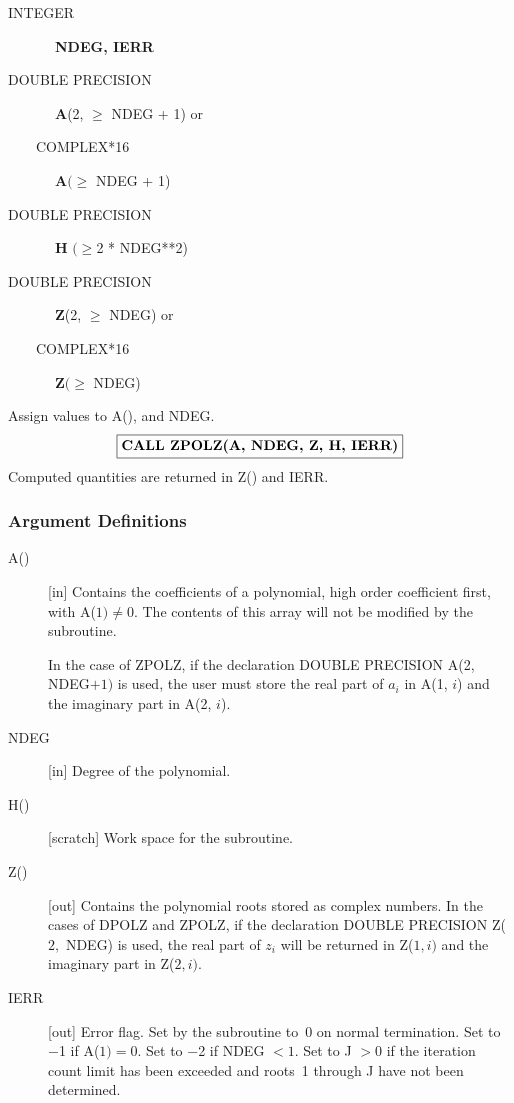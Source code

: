 \documentclass[twoside]{MATH77}
\begin{document}
\begin{description}
\item[INTEGER]  \ {\bf NDEG, IERR}

\item[DOUBLE PRECISION]  \ {\bf A}(2, $\geq $ NDEG + 1) or

\item[~~~~COMPLEX*16]  \ {\bf A}$(\geq $ NDEG + 1)

\item[DOUBLE PRECISION]  \ {\bf H} $(\geq $2 * NDEG**2)

\item[DOUBLE PRECISION]  \ {\bf Z}(2, $\geq $ NDEG) or

\item[~~~~COMPLEX*16]  \ {\bf Z}$(\geq $ NDEG)
\end{description}

Assign values to A(), and NDEG.%
$$
\fbox{{\bf CALL ZPOLZ(A, NDEG, Z, H, IERR)}}
$$
Computed quantities are returned in Z() and IERR.

\subsubsection{Argument Definitions}

\begin{description}
\item[A()]  [in] Contains the coefficients of a polynomial, high order
coefficient first, with A($1)\neq 0$. The contents of this array will not be
modified by the subroutine.

In the case of ZPOLZ, if the declaration DOUBLE PRECISION A(2, NDEG$+1)$ is
used, the user must store the real part of $a_i$ in A(1, $i$) and the imaginary
part in A(2, $i$).

\item[NDEG]  [in] Degree of the polynomial.

\item[H()]  [scratch] Work space for the subroutine.

\item[Z()]  [out] Contains the polynomial roots stored as complex numbers.
In the cases of DPOLZ and ZPOLZ, if the declaration DOUBLE PRECISION Z($2,$
NDEG) is used, the real part of $z_i$ will be returned in Z($1, i)$ and the
imaginary part in Z($2, i).$

\item[IERR]  [out] Error flag. Set by the subroutine to~0 on normal
termination. Set to $-$1 if A($1)=0$. Set to $-$2 if NDEG $<1$. Set to J $>0$
if the iteration count limit has been exceeded and roots~1 through J have
not been determined.
\end{description}
\end{document}
